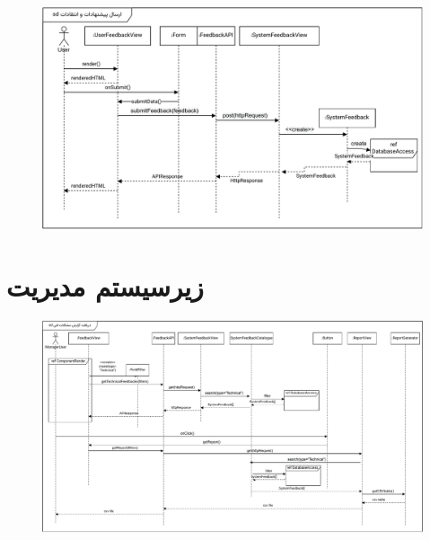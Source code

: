 \begin{figure}[ht!]
	\centering
	\includegraphics[scale=0.8]{figs/design-sequence/3-30.pdf}
\end{figure}

\FloatBarrier
\newpage

\section{زیرسیستم مدیریت}

\eject \pdfpagewidth=13in \pdfpageheight=9in

\FloatBarrier
\begin{figure}[ht!]
	\centering
	\includegraphics[scale=0.8]{figs/design-sequence/3-39.pdf}
\end{figure}
\FloatBarrier
\newpage

\eject \pdfpagewidth=11in \pdfpageheight=9in


